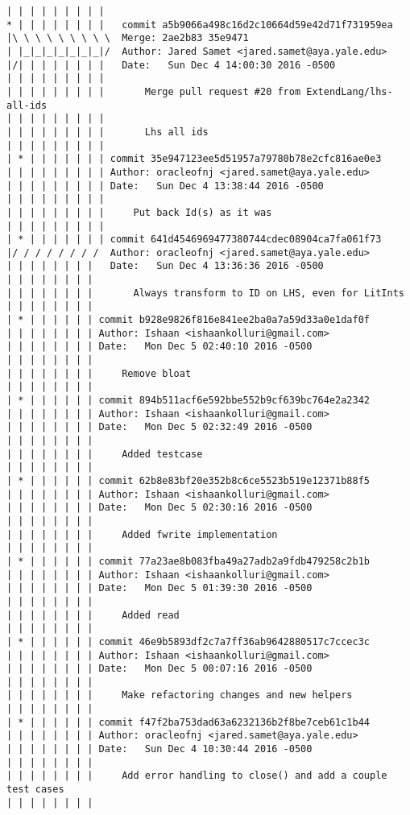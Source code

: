 \begin{lstlisting}
| | | | | | | | |            
* | | | | | | | |   commit a5b9066a498c16d2c10664d59e42d71f731959ea
|\ \ \ \ \ \ \ \ \  Merge: 2ae2b83 35e9471
| |_|_|_|_|_|_|_|/  Author: Jared Samet <jared.samet@aya.yale.edu>
|/| | | | | | | |   Date:   Sun Dec 4 14:00:30 2016 -0500
| | | | | | | | |   
| | | | | | | | |       Merge pull request #20 from ExtendLang/lhs-all-ids
| | | | | | | | |       
| | | | | | | | |       Lhs all ids
| | | | | | | | |          
| * | | | | | | | commit 35e947123ee5d51957a79780b78e2cfc816ae0e3
| | | | | | | | | Author: oracleofnj <jared.samet@aya.yale.edu>
| | | | | | | | | Date:   Sun Dec 4 13:38:44 2016 -0500
| | | | | | | | | 
| | | | | | | | |     Put back Id(s) as it was
| | | | | | | | |          
| * | | | | | | | commit 641d4546969477380744cdec08904ca7fa061f73
|/ / / / / / / /  Author: oracleofnj <jared.samet@aya.yale.edu>
| | | | | | | |   Date:   Sun Dec 4 13:36:36 2016 -0500
| | | | | | | |   
| | | | | | | |       Always transform to ID on LHS, even for LitInts
| | | | | | | |         
| * | | | | | | commit b928e9826f816e841ee2ba0a7a59d33a0e1daf0f
| | | | | | | | Author: Ishaan <ishaankolluri@gmail.com>
| | | | | | | | Date:   Mon Dec 5 02:40:10 2016 -0500
| | | | | | | | 
| | | | | | | |     Remove bloat
| | | | | | | |         
| * | | | | | | commit 894b511acf6e592bbe552b9cf639bc764e2a2342
| | | | | | | | Author: Ishaan <ishaankolluri@gmail.com>
| | | | | | | | Date:   Mon Dec 5 02:32:49 2016 -0500
| | | | | | | | 
| | | | | | | |     Added testcase
| | | | | | | |         
| * | | | | | | commit 62b8e83bf20e352b8c6ce5523b519e12371b88f5
| | | | | | | | Author: Ishaan <ishaankolluri@gmail.com>
| | | | | | | | Date:   Mon Dec 5 02:30:16 2016 -0500
| | | | | | | | 
| | | | | | | |     Added fwrite implementation
| | | | | | | |         
| * | | | | | | commit 77a23ae8b083fba49a27adb2a9fdb479258c2b1b
| | | | | | | | Author: Ishaan <ishaankolluri@gmail.com>
| | | | | | | | Date:   Mon Dec 5 01:39:30 2016 -0500
| | | | | | | | 
| | | | | | | |     Added read
| | | | | | | |         
| * | | | | | | commit 46e9b5893df2c7a7ff36ab9642880517c7ccec3c
| | | | | | | | Author: Ishaan <ishaankolluri@gmail.com>
| | | | | | | | Date:   Mon Dec 5 00:07:16 2016 -0500
| | | | | | | | 
| | | | | | | |     Make refactoring changes and new helpers
| | | | | | | |         
| * | | | | | | commit f47f2ba753dad63a6232136b2f8be7ceb61c1b44
| | | | | | | | Author: oracleofnj <jared.samet@aya.yale.edu>
| | | | | | | | Date:   Sun Dec 4 10:30:44 2016 -0500
| | | | | | | | 
| | | | | | | |     Add error handling to close() and add a couple test cases
| | | | | | | |         

\end{lstlisting}
